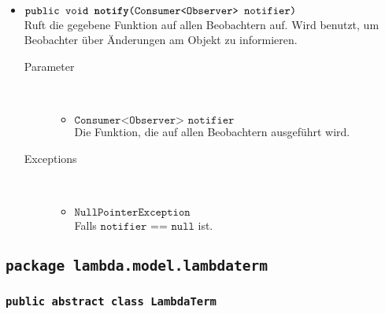 \begin{description}
\begin{itemize}
		\item $\texttt{public void \textbf{notify}(Consumer<Observer> notifier)}$ \\ Ruft die gegebene Funktion auf allen Beobachtern auf. Wird benutzt, um Beobachter über Änderungen am Objekt zu informieren.
		\begin{description}
			\item[Parameter] \hfill \\
			\vspace{-.8cm}
			\begin{itemize}
				\item $\texttt{Consumer<Observer> notifier}$ \\ Die Funktion, die auf allen Beobachtern ausgeführt wird.
			\end{itemize}
			\item[Exceptions] \hfill \\
			\vspace{-.8cm}
			\begin{itemize}
				\item $\texttt{NullPointerException}$ \\ Falls $\texttt{notifier == null}$ ist.
			\end{itemize}
		\end{description}
	\end{itemize}
\end{description}

\subsection{\texttt{package lambda.model.lambdaterm}}

\subsubsection{\normalfont \texttt{public abstract class \textbf{LambdaTerm} }}

